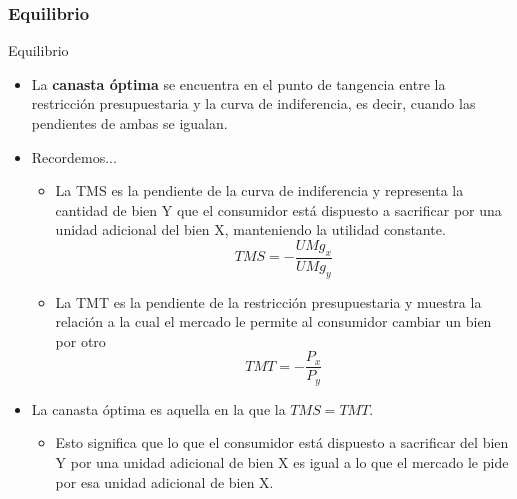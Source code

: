 \documentclass{beamer}
\begin{document}
\begin{frame}
\frametitle{Equilibrio}
\begin{center}
\end{center}
\end{frame}

\begin{frame}{Equilibrio}
    \begin{itemize}
    \item La \textbf{canasta óptima} se encuentra en el punto de tangencia entre la restricción presupuestaria y la curva de indiferencia, es decir, cuando las pendientes de ambas se igualan. 
    \item Recordemos...
    \begin{itemize}
    \footnotesize
    \item La TMS es la pendiente de la curva de indiferencia y representa la cantidad de bien Y que el consumidor está dispuesto a sacrificar por una unidad adicional del bien X, manteniendo la utilidad constante.
     \[TMS = - \frac{UMg_x}{UMg_y}\]
     \item La TMT es la pendiente de la restricción presupuestaria y muestra la relación a la cual el mercado le permite al consumidor cambiar un bien por otro
    \[TMT = - \frac{P_x}{P_y}\]
    \end{itemize}
     \normalsize
        \item La canasta óptima es aquella en la que la $TMS = TMT$. 
    \begin{itemize}
    \item Esto significa que lo que el consumidor está dispuesto a sacrificar del bien Y por una unidad adicional de bien X es igual a lo que el mercado le pide por esa unidad adicional de bien X.
    \end{itemize}
    \end{itemize}
\end{frame}
\end{document}
